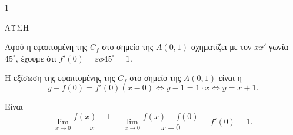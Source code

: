 \begin{ylh}{1}
    \item [Ύλη από εικόνα]
\end{ylh}
ΛΥΣΗ
\begin{alist}
\item Αφού η εφαπτομένη της $C_f$ στο σημείο της $A(0,1)$ σχηματίζει με τον $xx'$ γωνία $45^\circ$, έχουμε ότι $f'(0) = \varepsilon\phi45^\circ = 1$.
\item Η εξίσωση της εφαπτομένης της $C_f$ στο σημείο της $A(0,1)$ είναι η
\[ y - f(0) = f'(0)(x-0) \Leftrightarrow y-1 = 1 \cdot x \Leftrightarrow y=x+1. \]
\item Είναι
\[ \lim_{x \to 0} \frac{f(x)-1}{x} = \lim_{x \to 0} \frac{f(x)-f(0)}{x-0} = f'(0) = 1. \]
\end{alist}